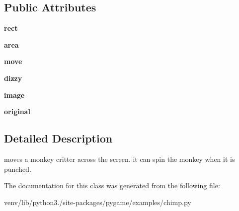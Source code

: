 \subsection*{Public Attributes}
\begin{DoxyCompactItemize}
\item 
\mbox{\label{classpygame_1_1examples_1_1chimp_1_1_chimp_a0d3a372e42fb5b8c8b12d583a6192a4c}} 
{\bfseries rect}
\item 
\mbox{\label{classpygame_1_1examples_1_1chimp_1_1_chimp_afe537133c952e8cca1612e3f353c8f16}} 
{\bfseries area}
\item 
\mbox{\label{classpygame_1_1examples_1_1chimp_1_1_chimp_ad340b346dc244efb52ac1a20b401dfb3}} 
{\bfseries move}
\item 
\mbox{\label{classpygame_1_1examples_1_1chimp_1_1_chimp_a1be76f91309f1437264f92803f0cff00}} 
{\bfseries dizzy}
\item 
\mbox{\label{classpygame_1_1examples_1_1chimp_1_1_chimp_ab530a68ffc72ae5b6f7bcbf607ea13c5}} 
{\bfseries image}
\item 
\mbox{\label{classpygame_1_1examples_1_1chimp_1_1_chimp_aff10f8f83752e699e02204fa0d580a86}} 
{\bfseries original}
\end{DoxyCompactItemize}


\subsection{Detailed Description}
\begin{DoxyVerb}moves a monkey critter across the screen. it can spin the
   monkey when it is punched.\end{DoxyVerb}
 

The documentation for this class was generated from the following file\+:\begin{DoxyCompactItemize}
\item 
venv/lib/python3./site-\/packages/pygame/examples/chimp.\+py\end{DoxyCompactItemize}
